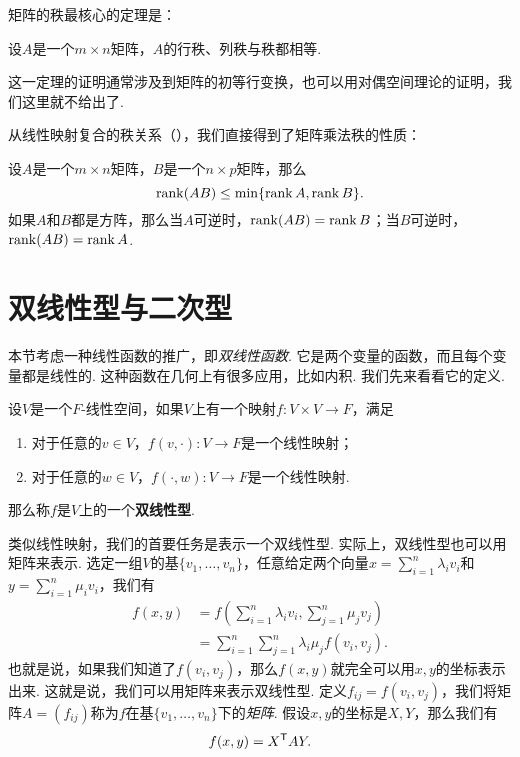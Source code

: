 矩阵的秩最核心的定理是：

\begin{theorem}\label{thm:rank}
    设$A$是一个$m\times n$矩阵，$A$的行秩、列秩与秩都相等. 
\end{theorem}
这一定理的证明通常涉及到矩阵的初等行变换，也可以用对偶空间理论的证明，我们这里就不给出了. 

从线性映射复合的秩关系（），我们直接得到了矩阵乘法秩的性质：

\begin{proposition}\label{prop:rank-multiplication}
    设$A$是一个$m\times n$矩阵，$B$是一个$n\times p$矩阵，那么
    \[\operatorname*{rank}(AB)\leq \min\{\operatorname*{rank} A,\operatorname*{rank} B\}.\]
如果$A$和$B$都是方阵，那么当$A$可逆时，$\operatorname*{rank}(AB)=\operatorname*{rank} B$；当$B$可逆时，$\operatorname*{rank}(AB)=\operatorname*{rank} A$.
\end{proposition}

\section{双线性型与二次型}

本节考虑一种线性函数的推广，即\emph{双线性函数}. 它是两个变量的函数，而且每个变量都是线性的. 这种函数在几何上有很多应用，比如内积. 我们先来看看它的定义. 

\begin{definition}[双线性型]\label{def:bilinear-form}
    设$V$是一个$F$-线性空间，如果$V$上有一个映射$f:V\times V\to F$，满足
    \begin{enumerate}
        \item 对于任意的$v\in V$，$f(v,\cdot):V\to F$是一个线性映射；
        \item 对于任意的$w\in V$，$f(\cdot,w):V\to F$是一个线性映射. 
    \end{enumerate}
    那么称$f$是$V$上的一个\textbf{双线性型}. 
\end{definition}

类似线性映射，我们的首要任务是表示一个双线性型. 实际上，双线性型也可以用矩阵来表示. 选定一组$V$的基$\{v_1,\dots,v_n\}$，任意给定两个向量$x=\sum_{i=1}^n\lambda_iv_i$和$y=\sum_{i=1}^n\mu_iv_i$，我们有
\begin{align*}
    f(x,y)&=f\left(\sum_{i=1}^n\lambda_iv_i,\sum_{j=1}^n\mu_jv_j\right)\\
    &=\sum_{i=1}^n\sum_{j=1}^n\lambda_i\mu_jf(v_i,v_j).
\end{align*}
也就是说，如果我们知道了$f(v_i,v_j)$，那么$f(x,y)$就完全可以用$x,y$的坐标表示出来. 这就是说，我们可以用矩阵来表示双线性型. 定义$f_{ij}=f(v_i,v_j)$，我们将矩阵$A=(f_{ij})$称为$f$在基$\{v_1,\dots,v_n\}$下的\emph{矩阵}. 假设$x,y$的坐标是$X,Y$，那么我们有
\[
    f(x,y)=X^{\mathsf{T}} AY.
\]

